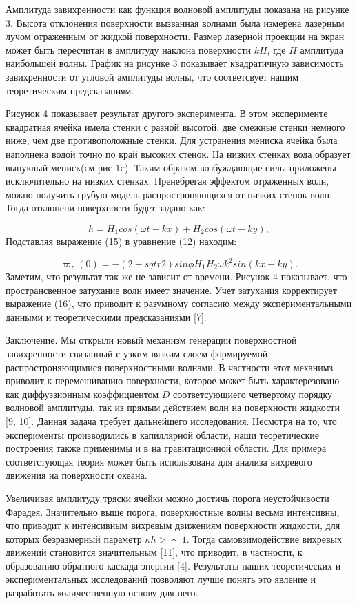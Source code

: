 Амплитуда завихренности как функция волновой амплитуды показана на рисунке 3. Высота отклонения поверхности вызванная волнами была измерена лазерным лучом отраженным от жидкой поверхности. Размер лазерной проекции на экран может быть пересчитан в амплитуду наклона поверхности $kH$, где $H$ амплитуда наибольшей волны. График на рисунке 3 показывает квадратичную зависимость завихренности от угловой амплитуды волны, что соответсвует нашим теоретическим предсказаниям.

Рисунок 4 показывает результат другого эксперимента. В этом эксперименте квадратная ячейка имела стенки с разной высотой: две смежные стенки немного ниже, чем две противоположные стенки. Для устранения мениска ячейка была наполнена водой точно по край высоких стенок. На низких стенках вода образует выпуклый мениск(см рис 1с). Таким образом возбуждающие силы приложены исключительно на низких стенках. Пренебрегая эффектом отраженных волн, можно получить грубую модель распростроняющихся от низких стенок волн. Тогда отклонени поверхности будет задано как:

\begin{equation}
h = H_1 cos(\omega t - kx) + H_2 cos(\omega t - ky),
\end{equation}
Подставляя выражение (15) в уравнение (12) находим:

\begin{equation}
\varpi_z(0) = -(2 + sqtr{2})sin \phi H_1 H_2 \omega k^2 sin(kx-ky).
\end{equation}
Заметим, что результат так же не зависит от времени. Рисунок 4 показывает, что пространсвенное затухание волн имеет значение. Учет затухания корректирует выражение (16), что приводит к разумному согласию между экспериментальными данными и теоретическими предсказаниями [7]. 

Заключение. Мы открыли новый механизм генерации поверхностной завихренности связанный с узким вязким слоем формируемой распростроняющимися поверхностными волнами. В частности этот механимз приводит к перемешиванию поверхности, которое может быть характерезовано как диффуззионным коэффициентом $D$ соответсующиего четвертому порядку волновой амплитуды, так из прямым действием волн на поверхности жидкости [9, 10]. Данная задача требует дальнейшего исследования. Несмотря на то, что эксперименты производились в капиллярной области, наши теоретические построения также применимы и в на гравитационной области. Для примера соответстующая теория может быть использована для анализа вихревого движения на поверхности океана.

Увеличивая амплитуду тряски ячейки можно достичь порога неустойчивости Фарадея. Значительно выше порога, поверхностные волны весьма интенсивны, что приводит к интенсивным вихревым движениям поверхности жидкости, для которых безразмерный параметр $\kappa h > \sim 1$. Тогда самовзимодействие вихревых движений становится значительным [11], что приводит, в частности, к образованию обратного каскада энергии [4]. Результаты наших теоретических и экспериментальных исследований позволяют лучше понять это явление и разработать количественную основу для него.

\clearpage
